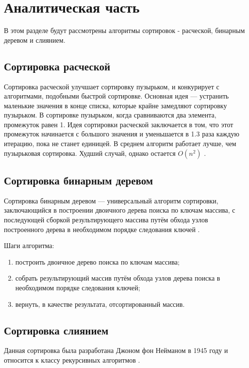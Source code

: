 \chapter{Аналитическая часть}
В этом разделе будут рассмотрены алгоритмы сортировок - расческой, бинарным деревом и слиянием.

\section{Сортировка расческой}
Сортировка расческой улучшает сортировку пузырьком, и конкурирует с алгоритмами, подобными быстрой сортировке. Основная идея --- устранить маленькие значения в конце списка, которые крайне замедляют сортировку пузырьком. В сортировке пузырьком, когда сравниваются два элемента, промежуток равен 1. Идея сортировки расческой заключается в том, что этот промежуток начинается с большого значения и уменьшается в 1.3 раза каждую итерацию, пока не станет единицей. В среднем алгоритм работает лучше, чем пузырьковая сортировка. Худший случай, однако остается $O(n^2)$ \cite{comb}.

\section{Сортировка бинарным деревом}

Сортировка бинарным деревом --- универсальный алгоритм сортировки, заключающийся в построении двоичного дерева поиска по ключам массива, с последующей сборкой результирующего массива путём обхода узлов построенного дерева в необходимом порядке следования ключей \cite{Knut}.

Шаги алгоритма:
\begin{enumerate}[label=\arabic*)]
	\item построить двоичное дерево поиска по ключам массива;
	\item собрать результирующий массив путём обхода узлов дерева поиска в необходимом порядке следования ключей;
	\item вернуть, в качестве результата, отсортированный массив.
\end{enumerate}

\section{Сортировка слиянием}
Данная сортировка была разработана Джоном фон Нейманом в 1945 году и относится к классу рекурсивных алгоритмов \cite{algos}. 

